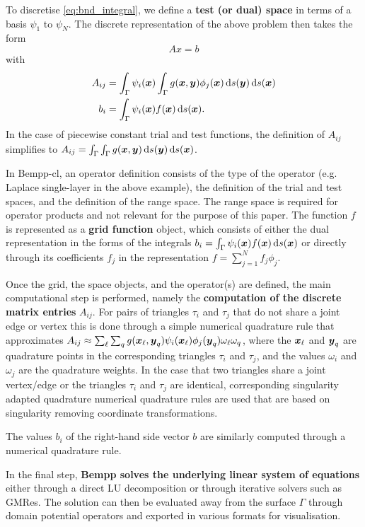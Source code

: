 To discretise \cref{eq:bnd_integral}, we define a \textbf{test (or dual) space} in terms of a basis \(\psi_1\) to \(\psi_N\). The discrete representation of the above problem then takes the form
$$
Ax = b
$$
with
\begin{align*}
A_{ij} &= \int_{\Gamma}\psi_i(\bx)\int_{\Gamma}g(\bx, \by)\phi_j(\bx)\ds[\by]\ds[\bx]\\
b_i &= \int_{\Gamma}\psi_i(\bx)f(\bx)\ds[\bx].
\end{align*}
In the case of piecewise constant trial and test functions, the definition of $A_{ij}$ simplifies to $A_{ij} = \int_{\Gamma}\int_{\Gamma}g(\bx, \by)\ds[\by]\ds[\bx]$.

In Bempp-cl, an operator definition consists of the type of the operator (e.g. Laplace single-layer in the above example),
the definition of the trial and test spaces, and the definition of the range space. The range space is required for operator
products and not relevant for the purpose of this paper. The function $f$ is represented as a \textbf{grid function} object, which
consists of either the dual representation in the forms of the integrals $b_i = \int_{\Gamma}\psi_i(\bx)f(\bx)\ds[\bx]$ or directly through its coefficients $f_j$ in the representation $f=\sum_{j=1}^N f_j\phi_j$.

Once the grid, the space objects, and the operator(s) are defined, the main computational step is performed, namely the \textbf{computation of the discrete matrix entries} $A_{ij}$. For pairs of triangles $\tau_i$ and $\tau_j$ that do not share a joint edge or vertex this is done through a simple numerical quadrature rule that approximates $A_{ij}\approx \sum_{\ell}\sum_{q} g(\boldsymbol{x}_\ell, \boldsymbol{y}_q)\psi_i(\boldsymbol{x}_\ell)\phi_j(\boldsymbol{y}_q)\omega_\ell\omega_q$, where the $\boldsymbol{x}_\ell$ and $\boldsymbol{y}_q$ are quadrature points in the corresponding triangles $\tau_i$ and $\tau_j$, and the values $\omega_i$ and $\omega_j$ are the quadrature weights. In the case that two triangles share a joint vertex/edge or the triangles $\tau_i$ and $\tau_j$ are identical, corresponding singularity adapted quadrature numerical quadrature rules are used that are based on singularity removing coordinate transformations.

The values $b_i$ of the right-hand side vector $b$ are similarly computed through a numerical quadrature rule.

In the final step, \textbf{Bempp solves the underlying linear system of equations} either through a direct LU decomposition or through iterative solvers such as GMRes. The solution can then be evaluated away from the surface $\Gamma$ through domain potential operators and exported in various formats for visualisation.


